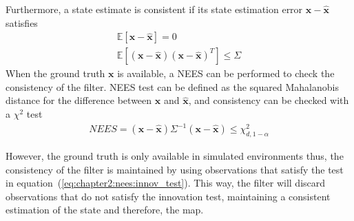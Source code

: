 Furthermore, a state estimate is consistent if its state estimation error $\bm{x} - \hat{\bm{x}}$ satisfies
\begin{align*}
    \mathbb{E}\left[\bm{x} - \hat{\bm{x}}\right] = 0\\
    \mathbb{E}\left[\left(\bm{x} - \hat{\bm{x}}\right)\left(\bm{x} - \hat{\bm{x}}\right)^T\right] \le \Sigma
\end{align*}
When the ground truth $\bm{x}$ is available, a \ac{NEES} can be performed to check the consistency of the filter. NEES test can be defined as the squared Mahalanobis distance for the difference between $\bm{x}$ and $\hat{\bm{x}}$, and consistency can be checked with a $\chi^2$ test
\begin{align*}
    NEES = \left(\bm{x} - \hat{\bm{x}}\right) \Sigma^{-1} \left(\bm{x} - \hat{\bm{x}}\right) \le \chi_{d, 1-\alpha}^2
\end{align*}

However, the ground truth is only available in simulated environments thus, the consistency of the filter is maintained by using observations that satisfy the test in equation~(\ref{eq:chapter2:nees:innov_test}). This way, the filter will discard observations that do not satisfy the innovation test, maintaining a consistent estimation of the state and therefore, the map.
